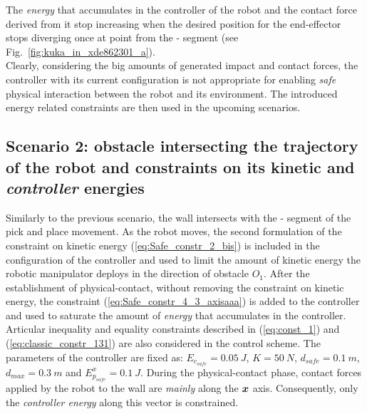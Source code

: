 \documentclass[letterpaper, 10 pt, conference]{ieeeconf}      %
\newcommand*\circled[1]{\tikz[baseline=(char.base)]{
            \node[shape=circle,draw,inner sep=0.5pt] (char) {#1};}}
\newcommand{\vect}[1]{\mbox{\boldmath${#1}$}}%
\begin{document}
The \textit{energy} that accumulates in the controller of the robot and the contact force derived from it stop increasing when the desired position for the end-effector stops diverging once at point \circled{3} from the \circled{2}-\circled{3} segment (see Fig.~\ref{fig:kuka_in_xde862301_a}).\\
Clearly, considering the big amounts of generated impact and contact forces, the controller with its current configuration is not appropriate for enabling \textit{safe} physical interaction between the robot and its environment. The introduced energy related constraints are then used in the upcoming scenarios.
\subsection{Scenario 2: obstacle intersecting the trajectory of the robot and constraints on its kinetic and \textit{controller} energies}
Similarly to the previous scenario, the wall intersects with the \circled{2}-\circled{3} segment of the pick and place movement. As the robot moves, the second formulation of the constraint on kinetic energy (\ref{eq:Safe_constr_2_bis}) is included in the configuration of the controller and used to limit the amount of kinetic energy the robotic manipulator deploys in the direction of obstacle $O_1$. After the establishment of physical-contact, without removing the constraint on kinetic energy, the constraint (\ref{eq:Safe_constr_4_3_axisaaa}) is added to the controller and used to saturate the amount of \textit{energy} that accumulates in the controller. Articular inequality and equality constraints described in (\ref{eq:const_1}) and (\ref{eq:classic_constr_131}) are also considered in the control scheme. The parameters of the controller are fixed as: $E_{c_{safe}} = 0.05~J$, $K = 50~N$, $d_{safe} = 0.1~m$, $d_{max} = 0.3~m$ and $E_{p_{safe}}^{x} = 0.1~J$. During the physical-contact phase, contact forces applied by the robot to the wall are \textit{mainly} along the $\vect{x}$ axis. Consequently, only the \textit{controller energy} along this vector is constrained. 
\end{document}
